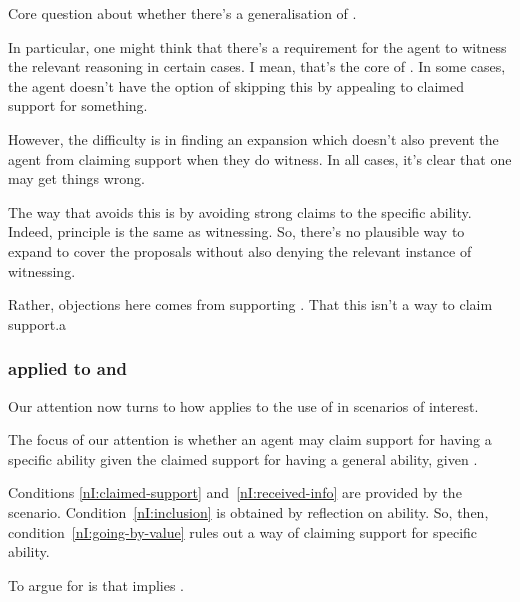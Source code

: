 \begin{note}
  Core question about whether there's a generalisation of \nI{}.

  In particular, one might think that there's a requirement for the agent to witness the relevant reasoning in certain cases.
  I mean, that's the core of \nI{}.
  In some cases, the agent doesn't have the option of skipping this by appealing to claimed support for something.

  However, the difficulty is in finding an expansion which doesn't also prevent the agent from claiming support when they do witness.
  In all cases, it's clear that one may get things wrong.

  The way that \ur{} avoids this is by avoiding strong claims to the specific ability.
  Indeed, principle is the same as witnessing.
  So, there's no plausible way to expand \nI{} to cover the proposals without also denying the relevant instance of witnessing.

  Rather, objections here comes from supporting \ESU{}.
  That this isn't a way to claim support.a
\end{note}

\newpage

\subsubsection{\nI{} applied to \gsi{} and \AR{}}
\label{sec:ni-applies-ar}

\begin{note}
  Our attention now turns to how \nI{} applies to the use of \aben{} in scenarios of interest.

  The focus of our attention is whether an agent may claim support for having a specific ability given the claimed support for having a general ability, given \gsi{}.
\end{note}

\begin{note}
  Conditions \ref{nI:claimed-support} and~\ref{nI:received-info} are provided by the scenario.
  Condition~\ref{nI:inclusion} is obtained by reflection on ability.
  So, then, condition~\ref{nI:going-by-value} rules out a way of claiming support for specific ability.

  To argue for is that \AR{} implies \RBV{}.
\end{note}

